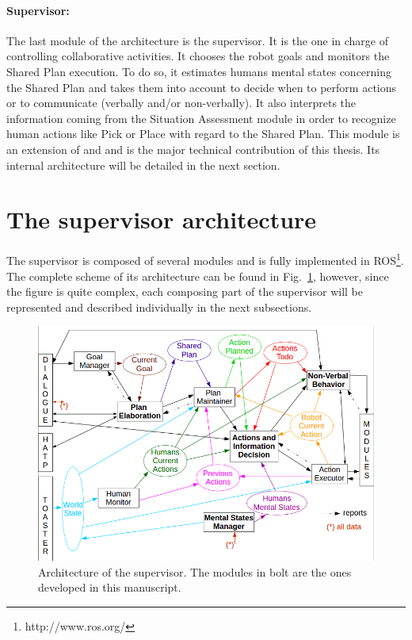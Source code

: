 \documentclass[english,a4paper,11pt,twoside]{StyleThese}
\begin{document}
\paragraph{Supervisor:}
The last module of the architecture is the supervisor. It is the one in charge of controlling collaborative activities. It chooses the robot goals and monitors the Shared Plan execution. To do so, it estimates humans mental states concerning the Shared Plan and takes them into account to decide when to perform actions or to communicate (verbally and/or non-verbally). It also interprets the information coming from the Situation Assessment module in order to recognize human actions like Pick or Place with regard to the Shared Plan. This module is an extension of \cite{clodic2009shary} and \cite{fiore2016planning} and is the major technical contribution of this thesis. Its internal architecture will be detailed in the next section.

\newpage
\section{The supervisor architecture}

The supervisor is composed of several modules and is fully implemented in ROS\footnote{http://www.ros.org/}. The complete scheme of its architecture can be found in Fig.~\ref{fig:archiSup}, however, since the figure is quite complex, each composing part of the supervisor will be represented and described individually in the next subsections. 

\begin{figure}[!h]
	\centering
    \includegraphics[width=\textwidth]{figs/Chapter2/ArchiSup.png}
    \caption{Architecture of the supervisor. The modules in bolt are the ones developed in this manuscript.}
    \label{fig:archiSup}
\end{figure}
\end{document}
